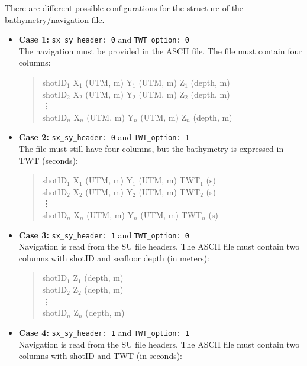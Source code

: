 \documentclass[11pt, oneside]{article}   	%
\begin{document}
There are different possible configurations for the structure of the bathymetry/navigation file. 
\begin{itemize}
    \item \textbf{Case 1:} \texttt{sx\_sy\_header: 0} and \texttt{TWT\_option: 0} \\
    The navigation must be provided in the ASCII file. The file must contain four columns:

    \begin{quote}
    shotID$_1$ \quad X$_1$ (UTM, m) \quad Y$_1$ (UTM, m) \quad Z$_1$ (depth, m) \\
    shotID$_2$ \quad X$_2$ (UTM, m) \quad Y$_2$ (UTM, m) \quad Z$_2$ (depth, m) \\
    \quad \vdots \\
    shotID$_n$ \quad X$_n$ (UTM, m) \quad Y$_n$ (UTM, m) \quad Z$_n$ (depth, m)
    \end{quote}

    \item \textbf{Case 2:} \texttt{sx\_sy\_header: 0} and \texttt{TWT\_option: 1} \\
    The file must still have four columns, but the bathymetry is expressed in TWT (seconds):

    \begin{quote}
    shotID$_1$ \quad X$_1$ (UTM, m) \quad Y$_1$ (UTM, m) \quad TWT$_1$ (s) \\
    shotID$_2$ \quad X$_2$ (UTM, m) \quad Y$_2$ (UTM, m) \quad TWT$_2$ (s) \\
    \quad \vdots \\
    shotID$_n$ \quad X$_n$ (UTM, m) \quad Y$_n$ (UTM, m) \quad TWT$_n$ (s)
    \end{quote}

    \item \textbf{Case 3:} \texttt{sx\_sy\_header: 1} and \texttt{TWT\_option: 0} \\
    Navigation is read from the SU file headers. The ASCII file must contain two columns with shotID and seafloor depth (in meters):

    \begin{quote}
    shotID$_1$ \quad Z$_1$ (depth, m) \\
    shotID$_2$ \quad Z$_2$ (depth, m) \\
    \quad \vdots \\
    shotID$_n$ \quad Z$_n$ (depth, m)
    \end{quote}

    \item \textbf{Case 4:} \texttt{sx\_sy\_header: 1} and \texttt{TWT\_option: 1} \\
    Navigation is read from the SU file headers. The ASCII file must contain two columns with shotID and TWT (in seconds):


\end{itemize}
\end{document}
